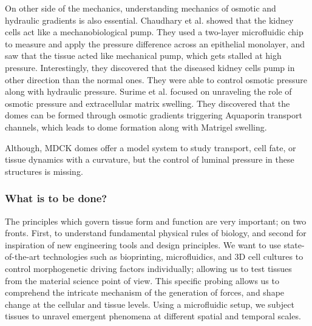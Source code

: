 \documentclass[
]{article}
\begin{document}
On other side of the mechanics, understanding mechanics of osmotic and
hydraulic gradients is also essential. Chaudhary et al. showed that the
kidney cells act like a mechanobiological pump. They used a two-layer
microfluidic chip to measure and apply the pressure difference across an
epithelial monolayer, and saw that the tissue acted like mechanical
pump, which gets stalled at high pressure. Interestingly, they
discovered that the diseased kidney cells pump in other direction than
the normal ones. They were able to control osmotic pressure along with
hydraulic pressure. Surime et al. focused on unraveling the role of
osmotic pressure and extracellular matrix swelling. They discovered that
the domes can be formed through osmotic gradients triggering Aquaporin
transport channels, which leads to dome formation along with Matrigel
swelling.

Although, MDCK domes offer a model system to study transport, cell fate,
or tissue dynamics with a curvature, but the control of luminal pressure
in these structures is missing.

\hypertarget{what-is-to-be-done}{%
\subsubsection{What is to be done?}\label{what-is-to-be-done}}

The principles which govern tissue form and function are very important;
on two fronts. First, to understand fundamental physical rules of
biology, and second for inspiration of new engineering tools and design
principles. We want to use state-of-the-art technologies such as
bioprinting, microfluidics, and 3D cell cultures to control
morphogenetic driving factors individually; allowing us to test tissues
from the material science point of view. This specific probing allows us
to comprehend the intricate mechanism of the generation of forces, and
shape change at the cellular and tissue levels. Using a microfluidic
setup, we subject tissues to unravel emergent phenomena at different
spatial and temporal scales.
\end{document}
